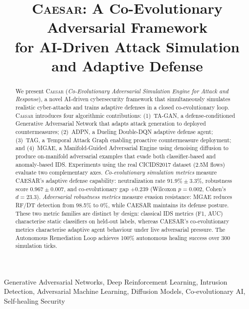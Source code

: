 \documentclass[conference]{IEEEtran}
\newcommand{\caesar}{\textsc{Caesar}}
\newcommand{\tagan}{\textsc{TA-GAN}}
\newcommand{\adpn}{\textsc{ADPN}}
\newcommand{\tagraph}{\textsc{TAG}}
\newcommand{\mgae}{\textsc{MGAE}}
\begin{document}
\title{\caesar: A Co-Evolutionary Adversarial Framework\\
       for AI-Driven Attack Simulation and Adaptive Defense}

\author{
}

\maketitle

\begin{abstract}
We present \caesar{} (\textit{Co-Evolutionary Adversarial Simulation Engine
for Attack and Response}), a novel AI-driven cybersecurity framework that
simultaneously simulates realistic cyber-attacks and trains adaptive
defenses in a closed co-evolutionary loop.
\caesar{} introduces four algorithmic contributions:
(1)~\tagan{}, a defense-conditioned Generative Adversarial Network
that adapts attack generation to deployed countermeasures;
(2)~\adpn{}, a Dueling Double-DQN adaptive defense agent;
(3)~\tagraph{}, a Temporal Attack Graph enabling proactive countermeasure
deployment; and
(4)~\mgae{}, a Manifold-Guided Adversarial Engine using denoising diffusion
to produce on-manifold adversarial examples that evade both classifier-based
and anomaly-based IDS.
Experiments using the real CICIDS2017 dataset (2.5M flows) evaluate two
complementary axes. \textit{Co-evolutionary simulation metrics} measure
CAESAR's adaptive defense capability: neutralization rate
$\mathbf{91.9\% \pm 3.3\%}$, robustness score $\mathbf{0.967 \pm 0.007}$,
and co-evolutionary gap $\mathbf{+0.239}$ (Wilcoxon $p = 0.002$,
Cohen's $d = 23.3$). \textit{Adversarial robustness metrics} measure
evasion resistance: \mgae{} reduces RF/DT detection from 98.5\% to 0\%,
while CAESAR maintains its defense posture.
These two metric families are distinct by design: classical IDS metrics
(F1, AUC) characterise static classifiers on held-out labels, whereas
CAESAR's co-evolutionary metrics characterise adaptive agent behaviour
under live adversarial pressure. The Autonomous Remediation Loop achieves
100\% autonomous healing success over 300 simulation ticks.
\end{abstract}

\begin{IEEEkeywords}
Generative Adversarial Networks, Deep Reinforcement Learning,
Intrusion Detection, Adversarial Machine Learning, Diffusion Models,
Co-evolutionary AI, Self-healing Security
\end{IEEEkeywords}
\end{document}
